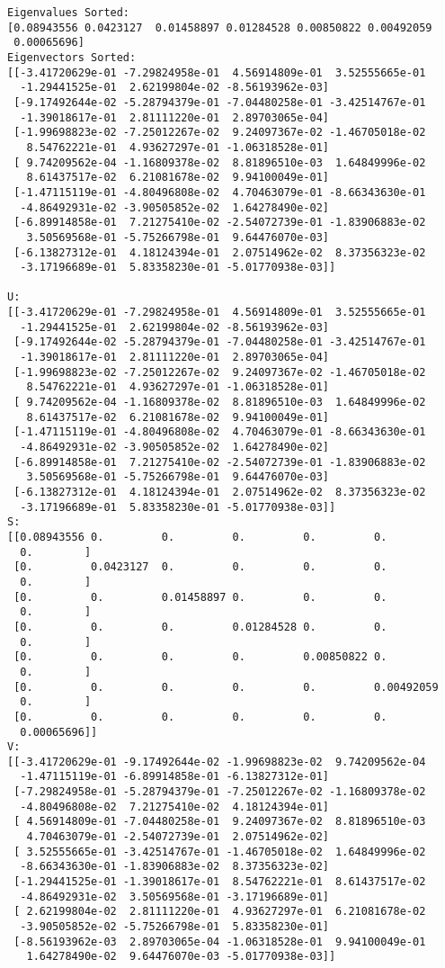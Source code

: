 \documentclass[11pt]{article}
\begin{document}
    \begin{Verbatim}[commandchars=\\\{\}]
Eigenvalues Sorted:
[0.08943556 0.0423127  0.01458897 0.01284528 0.00850822 0.00492059
 0.00065696]
Eigenvectors Sorted:
[[-3.41720629e-01 -7.29824958e-01  4.56914809e-01  3.52555665e-01
  -1.29441525e-01  2.62199804e-02 -8.56193962e-03]
 [-9.17492644e-02 -5.28794379e-01 -7.04480258e-01 -3.42514767e-01
  -1.39018617e-01  2.81111220e-01  2.89703065e-04]
 [-1.99698823e-02 -7.25012267e-02  9.24097367e-02 -1.46705018e-02
   8.54762221e-01  4.93627297e-01 -1.06318528e-01]
 [ 9.74209562e-04 -1.16809378e-02  8.81896510e-03  1.64849996e-02
   8.61437517e-02  6.21081678e-02  9.94100049e-01]
 [-1.47115119e-01 -4.80496808e-02  4.70463079e-01 -8.66343630e-01
  -4.86492931e-02 -3.90505852e-02  1.64278490e-02]
 [-6.89914858e-01  7.21275410e-02 -2.54072739e-01 -1.83906883e-02
   3.50569568e-01 -5.75266798e-01  9.64476070e-03]
 [-6.13827312e-01  4.18124394e-01  2.07514962e-02  8.37356323e-02
  -3.17196689e-01  5.83358230e-01 -5.01770938e-03]]

U:
[[-3.41720629e-01 -7.29824958e-01  4.56914809e-01  3.52555665e-01
  -1.29441525e-01  2.62199804e-02 -8.56193962e-03]
 [-9.17492644e-02 -5.28794379e-01 -7.04480258e-01 -3.42514767e-01
  -1.39018617e-01  2.81111220e-01  2.89703065e-04]
 [-1.99698823e-02 -7.25012267e-02  9.24097367e-02 -1.46705018e-02
   8.54762221e-01  4.93627297e-01 -1.06318528e-01]
 [ 9.74209562e-04 -1.16809378e-02  8.81896510e-03  1.64849996e-02
   8.61437517e-02  6.21081678e-02  9.94100049e-01]
 [-1.47115119e-01 -4.80496808e-02  4.70463079e-01 -8.66343630e-01
  -4.86492931e-02 -3.90505852e-02  1.64278490e-02]
 [-6.89914858e-01  7.21275410e-02 -2.54072739e-01 -1.83906883e-02
   3.50569568e-01 -5.75266798e-01  9.64476070e-03]
 [-6.13827312e-01  4.18124394e-01  2.07514962e-02  8.37356323e-02
  -3.17196689e-01  5.83358230e-01 -5.01770938e-03]]
S:
[[0.08943556 0.         0.         0.         0.         0.
  0.        ]
 [0.         0.0423127  0.         0.         0.         0.
  0.        ]
 [0.         0.         0.01458897 0.         0.         0.
  0.        ]
 [0.         0.         0.         0.01284528 0.         0.
  0.        ]
 [0.         0.         0.         0.         0.00850822 0.
  0.        ]
 [0.         0.         0.         0.         0.         0.00492059
  0.        ]
 [0.         0.         0.         0.         0.         0.
  0.00065696]]
V:
[[-3.41720629e-01 -9.17492644e-02 -1.99698823e-02  9.74209562e-04
  -1.47115119e-01 -6.89914858e-01 -6.13827312e-01]
 [-7.29824958e-01 -5.28794379e-01 -7.25012267e-02 -1.16809378e-02
  -4.80496808e-02  7.21275410e-02  4.18124394e-01]
 [ 4.56914809e-01 -7.04480258e-01  9.24097367e-02  8.81896510e-03
   4.70463079e-01 -2.54072739e-01  2.07514962e-02]
 [ 3.52555665e-01 -3.42514767e-01 -1.46705018e-02  1.64849996e-02
  -8.66343630e-01 -1.83906883e-02  8.37356323e-02]
 [-1.29441525e-01 -1.39018617e-01  8.54762221e-01  8.61437517e-02
  -4.86492931e-02  3.50569568e-01 -3.17196689e-01]
 [ 2.62199804e-02  2.81111220e-01  4.93627297e-01  6.21081678e-02
  -3.90505852e-02 -5.75266798e-01  5.83358230e-01]
 [-8.56193962e-03  2.89703065e-04 -1.06318528e-01  9.94100049e-01
   1.64278490e-02  9.64476070e-03 -5.01770938e-03]]


\end{Verbatim}
\end{document}
